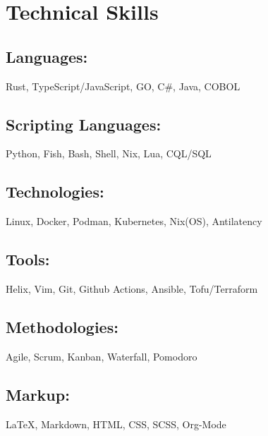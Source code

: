 \section{Technical Skills}

\subsection{Languages:} Rust, TypeScript/JavaScript, GO, C\#, Java, COBOL
\subsection{Scripting Languages:} Python, Fish, Bash, Shell, Nix, Lua, CQL/SQL 
\subsection{Technologies:} Linux, Docker, Podman, Kubernetes, Nix(OS), Antilatency 
\subsection{Tools:} Helix, Vim, Git, Github Actions, Ansible, Tofu/Terraform
\subsection{Methodologies:} Agile, Scrum, Kanban, Waterfall, Pomodoro
\subsection{Markup:} {\LaTeX}, Markdown, HTML, CSS, SCSS, Org-Mode
